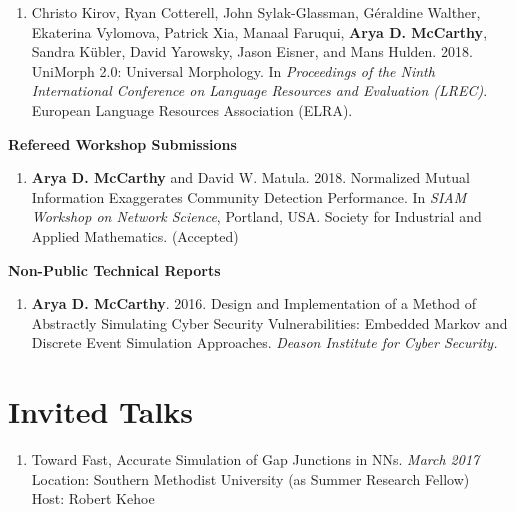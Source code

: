 \documentclass[margin, 10pt]{res} %
\newcommand{\Year}[1]{\emph{#1}}
\begin{document}
\begin{resume}
\begin{enumerate}
\item Christo Kirov, Ryan Cotterell, John Sylak-Glassman, G\'eraldine Walther, Ekaterina Vylomova, Patrick Xia, Manaal Faruqui, \textbf{Arya D. McCarthy}, Sandra K{\"u}bler, David Yarowsky, Jason Eisner, and Mans Hulden. 2018. {UniMorph 2.0: Universal Morphology}. In \emph{Proceedings of the Ninth International Conference on Language Resources and Evaluation (LREC)}. European Language Resources Association (ELRA).
\end{enumerate}

\textbf{Refereed Workshop Submissions}
\begin{enumerate}[resume]
\item \textbf{Arya D. McCarthy} and David W. Matula. 2018. Normalized Mutual Information Exaggerates Community Detection Performance. In \emph{SIAM Workshop on Network Science}, Portland, USA. Society for Industrial and Applied Mathematics. (Accepted)
\end{enumerate}

\begin{samepage}
\textbf{Non-Public Technical Reports}
\begin{enumerate}[resume]
\item \textbf{Arya D. McCarthy}. 2016. Design and Implementation of a Method of Abstractly Simulating Cyber Security Vulnerabilities: Embedded Markov and Discrete Event Simulation Approaches. \emph{Deason Institute for Cyber Security.}
\end{enumerate}
\end{samepage}


\section{Invited Talks}
\begin{enumerate}
\item Toward Fast, Accurate Simulation of Gap Junctions in NNs. \hfill \Year{March 2017}\\
Location: Southern Methodist University (as Summer Research Fellow)\\
Host: Robert Kehoe
\end{enumerate}



\end{resume}
\end{document}
